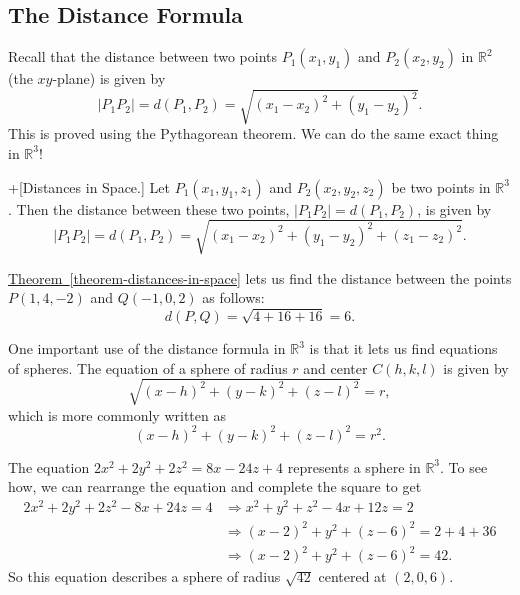 \documentclass[10pt,]{book}
\theoremstyle{ptxplainnotitle}
\theoremstyle{ptxplaintitle}
\theoremstyle{ptxplainnotitle}
\theoremstyle{ptxplaintitle}
\theoremstyle{ptxplainnotitle}
\theoremstyle{ptxplaintitle}
\theoremstyle{ptxdefinitionnotitle}
\theoremstyle{ptxdefinitiontitle}
\theoremstyle{ptxdefinitionnotitle}
\theoremstyle{ptxdefinitiontitle}
\theoremstyle{ptxdefinitionnotitle}
\theoremstyle{ptxdefinitiontitle}
\theoremstyle{ptxdefinitionnotitle}
\theoremstyle{ptxdefinitiontitle}
\theoremstyle{ptxdefinitionnotitle}
\theoremstyle{ptxdefinitiontitle}
\numberwithin{equation}{section}
\newcommand{\RR}{\mathbb{R}}
\begin{document}
\subsection[{The Distance Formula}]{The Distance Formula}\label{subsection-the-distance-formula}
\hypertarget{p-730}{}%
Recall that the distance between two points \(P_{1}(x_{1},y_{1})\) and \(P_{2}(x_{2},y_{2})\) in \(\RR^{2}\) (the \(xy\)-plane) is given by%
%
\begin{equation*}
|P_{1}P_{2}| = d(P_{1},P_{2}) = \sqrt{(x_{1}-x_{2})^{2}+(y_{1}-y_{2})^{2}}.
\end{equation*}
\hypertarget{p-731}{}%
This is proved using the Pythagorean theorem. We can do the same exact thing in \(\RR^{3}\)!%
\begin{theorem}+[{Distances in Space.}]\label{theorem-distances-in-space}
\hypertarget{p-732}{}%
Let \(P_{1}(x_{1},y_{1},z_{1})\) and \(P_{2}(x_{2},y_{2},z_{2})\) be two points in \(\RR^{3}\). Then the distance between these two points, \(|P_{1}P_{2}| = d(P_{1},P_{2})\), is given by%
\begin{equation*}
|P_{1}P_{2}| = d(P_{1},P_{2}) = \sqrt{(x_{1}-x_{2})^{2}+(y_{1}-y_{2})^{2} + (z_{1}-z_{2})^{2}}.
\end{equation*}
%
\end{theorem}
\begin{example}\label{example-computing-distances}
\hypertarget{p-733}{}%
\hyperref[theorem-distances-in-space]{Theorem~\ref{theorem-distances-in-space}} lets us find the distance between the points \(P(1,4,-2)\) and \(Q(-1,0,2)\) as follows:%
%
\begin{equation*}
d(P,Q) = \sqrt{4+16+16} = 6.
\end{equation*}
\end{example}
\hypertarget{p-734}{}%
One important use of the distance formula in \(\RR^{3}\) is that it lets us find equations of spheres. The equation of a sphere of radius \(r\) and center \(C(h,k,l)\) is given by%
\begin{equation*}
\sqrt{(x-h)^{2}+(y-k)^{2}+(z-l)^{2}} = r,
\end{equation*}
which is more commonly written as%
\begin{equation*}
(x-h)^{2}+(y-k)^{2}+(z-l)^{2} = r^{2}.
\end{equation*}
%
\begin{example}\label{example-equation-of-a-sphere}
\hypertarget{p-735}{}%
The equation \(2x^{2}+2y^{2}+2z^{2} = 8x - 24z + 4\) represents a sphere in \(\RR^{3}\). To see how, we can rearrange the equation and complete the square to get%
%
\begin{align*}
2x^{2}+2y^{2}+2z^{2} - 8x + 24z = 4 & \Rightarrow x^{2}+y^{2}+z^{2} - 4x + 12z = 2 \\
& \Rightarrow (x-2)^{2} + y^{2} + (z-6)^{2} = 2 + 4 + 36\\
& \Rightarrow (x-2)^{2} + y^{2} + (z-6)^{2} = 42.
\end{align*}
\hypertarget{p-736}{}%
So this equation describes a sphere of radius \(\sqrt{42}\) centered at \((2,0,6)\).%
\end{example}
\end{document}
